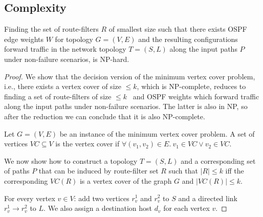 \subsection{Complexity} \label{sec:rfcomplexity}

\begin{theorem}
Finding the set of route-filters $R$ of smallest size such
 that there exists OSPF edge weights $W$ for topology $G=(V,E)$ 
 and the resulting configurations forward traffic in the network
 topology $T=(S,L)$ along the
input paths $P$ under non-failure scenarios, is NP-hard.
\end{theorem}

\begin{proof}
We show that the decision version of the minimum 
vertex cover problem, i.e., there exists a vertex cover
of size $ \leq k$, which is NP-complete, 
reduces to finding a set of route-filters of size $ \leq k$ \
and OSPF weights which forward traffic along the
input paths under non-failure scenarios. 
The latter is also in NP, so after the reduction we 
can conclude that it is also NP-complete.

Let $G = (V,E)$ be an instance of the 
minimum vertex cover problem. A set of
vertices $VC \subseteq V$ is the vertex cover
if $\forall (v_1, v_2) \in E. ~v_1 \in VC \vee v_2 \in VC$. 

We now show how to construct a topology $T=(S,L)$ 
and a corresponding set of paths $P$ that can be 
induced by route-filter set $R$ such that $|R| \leq k$  
iff the corresponding $VC(R)$ is a vertex cover of 
the graph $G$ and $|VC(R)| \leq k$.

For every vertex $v \in V$: add two vertices $r_v^1$ 
and $r_v^2$ to $S$ and a directed link $r_v^1 \rightarrow r_v^2$ to $L$. 
We also assign a destination host $d_v$ for each vertex $v$. 


\end{proof}
